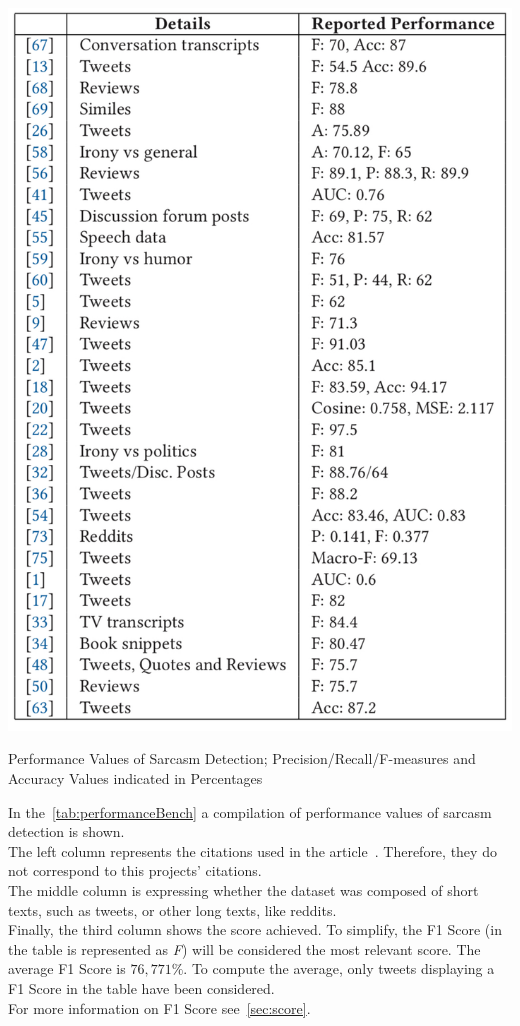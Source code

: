 \begin{table}
	\centering
	\includegraphics[scale=0.35]{img/performanceValues.jpeg}
	\caption{Performance Values of Sarcasm Detection; Precision/Recall/F-measures and Accuracy Values indicated in Percentages~\cite{joshi2017automatic}}
	\label{tab:performanceBench}
\end{table}
In the~\cref{tab:performanceBench} a compilation of performance values of sarcasm detection is shown.\\ 
The left column represents the citations used in the article~\cite{joshi2017automatic}. Therefore, they do not correspond to this projects' citations.\\
The middle column is expressing whether the dataset was composed of short texts, such as tweets, or other long texts, like reddits.\\
Finally, the third column shows the score achieved. To simplify, the F1 Score (in the table is represented as \textit{F}) will be considered the most relevant score. The average F1 Score is $76,771\%$. To compute the average, only tweets displaying a F1 Score in the table have been considered.\\
For more information on F1 Score see~\cref{sec:score}.